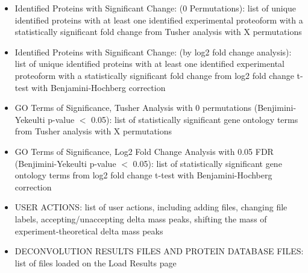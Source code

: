 \begin{itemize}
\begin{itemize}
\item Identified Proteins with Significant Change: (0 Permutations): list of unique identified proteins with at least one identified experimental proteoform with a statistically significant fold change from Tusher analysis with X permutations
\item Identified Proteins with Significant Change: (by log2 fold change analysis): list of unique identified proteins with at least one identified experimental proteoform with a statistically significant fold change from log2 fold change t-test with Benjamini-Hochberg correction
\item GO Terms of Significance, Tusher Analysis with 0 permutations (Benjimini-Yekeulti p-value $<$ 0.05): list of statistically significant gene ontology terms from Tusher analysis with X permutations
\item GO Terms of Significance, Log2 Fold Change Analysis with 0.05 FDR (Benjimini-Yekeulti p-value $<$ 0.05): list of statistically significant gene ontology terms from log2 fold change t-test with Benjamini-Hochberg correction
\item USER ACTIONS: list of user actions, including adding files, changing file labels, accepting/unaccepting delta mass peaks, shifting the mass of experiment-theoretical delta mass peaks
\item DECONVOLUTION RESULTS FILES AND PROTEIN DATABASE FILES: list of files loaded on the Load Results page
\end{itemize}
\end{itemize}


